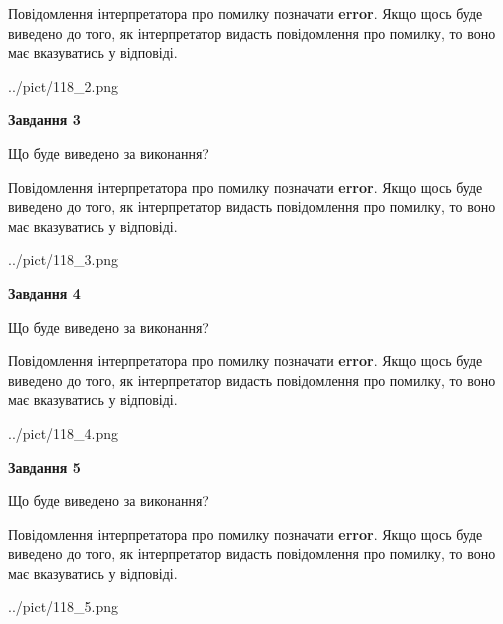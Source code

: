 \documentclass[12pt, ukrainian]{article}
\begin{document}
{\begin {large}
Повідомлення інтерпретатора про помилку позначати \textbf{error}.
Якщо щось буде виведено до того, як інтерпретатор видасть повідомлення про помилку, 
то воно має вказуватись у відповіді. \par


\begin{center}
	{../pict/118_2.png}
\end{center}
\newpage

{\begin {center}\textbf{Завдання 3}\end {center}}\par
Що буде виведено за виконання?

Повідомлення інтерпретатора про помилку позначати \textbf{error}.
Якщо щось буде виведено до того, як інтерпретатор видасть повідомлення про помилку, 
то воно має вказуватись у відповіді. \par


\begin{center}
	{../pict/118_3.png}
\end{center}
\newpage

{\begin {center}\textbf{Завдання 4}\end {center}}\par
Що буде виведено за виконання?

Повідомлення інтерпретатора про помилку позначати \textbf{error}.
Якщо щось буде виведено до того, як інтерпретатор видасть повідомлення про помилку, 
то воно має вказуватись у відповіді. \par


\begin{center}
	{../pict/118_4.png}
\end{center}
\newpage

{\begin {center}\textbf{Завдання 5}\end {center}}\par
Що буде виведено за виконання?

Повідомлення інтерпретатора про помилку позначати \textbf{error}.
Якщо щось буде виведено до того, як інтерпретатор видасть повідомлення про помилку, 
то воно має вказуватись у відповіді. \par


\begin{center}
	{../pict/118_5.png}
\end{center}
\newpage


\end{large}}
\end{document}
